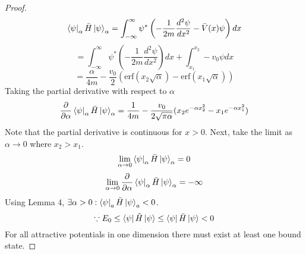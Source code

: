 \begin{sol}
\begin{proof}
\begin{equation}
	\bra\psi_\alpha\bar H\ket\psi_\alpha=\int_{-\infty}^{\infty} \psi^*\left(-\frac{1}{2m}\frac{d^2\psi}{dx^2}-\bar V(x)\psi\right)dx
\end{equation}
\begin{equation}
	=\int_{-\infty}^\infty\psi^*\left(-\frac{1}{2m}\frac{d^2\psi}{dx^2}\right)dx+\int_{x_1}^{x_2}-v_0\psi dx
\end{equation} 
\begin{equation}
	=\frac{\alpha}{4m}-\frac{v_0}{2}(\mathrm{erf}(x_2\sqrt{\alpha})-\mathrm{erf}(x_1\sqrt{\alpha}))
\end{equation} 
Taking the partial derivative with respect to $\alpha$ 
\begin{equation}
	\frac{\partial}{\partial\alpha}\bra\psi_\alpha\bar H\ket\psi_\alpha=\frac{1}{4m}-\frac{v_0}{2\sqrt{\pi\alpha}}(x_2e^{-\alpha x_2^2}-x_1e^{-\alpha x_1^2})
\end{equation}
Note that the partial derivative is continuous for $x>0$. Next, take the limit as $\alpha\to 0$ where $x_2>x_1$.
\begin{equation}
	\lim_{\alpha\to 0}\bra\psi_\alpha\bar H\ket\psi_\alpha=0
\end{equation}
\begin{equation}
	\lim_{\alpha\to 0}\frac{\partial}{\partial\alpha}\bra\psi_\alpha\bar H\ket\psi_\alpha=-\infty
\end{equation} 
Using Lemma 4, $\exists\alpha>0: \bra\psi_a\bar H\ket\psi_a<0$.
\begin{equation}
	\because E_0\leq\bra\psi\hat H\ket\psi\leq\bra\psi\bar H\ket\psi<0
\end{equation} 
For all attractive potentials in one dimension there must exist at least one bound state.
\end{proof}
\end{sol}